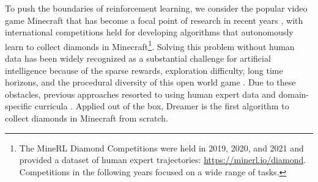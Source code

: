 To push the boundaries of reinforcement learning, we consider the popular video game Minecraft that has become a focal point of research in recent years \citep{guss2019minerl,kanitscheider2021minecraftcurriculum,baker2022vpt}, with international competitions held for developing algorithms that autonomously learn to collect diamonds in Minecraft\footnote{
The MineRL Diamond Competitions were held in 2019, 2020, and 2021 and provided a dataset of human expert trajectories: \url{https://minerl.io/diamond}. Competitions in the following years focused on a wide range of tasks.}.
Solving this problem without human data has been widely recognized as a substantial challenge for artificial intelligence because of the sparse rewards, exploration difficulty, long time horizons, and the procedural diversity of this open world game \citep{guss2019minerl}.
Due to these obstacles, previous approaches resorted to using human expert data and domain-specific curricula \citep{kanitscheider2021minecraftcurriculum,baker2022vpt}.
Applied out of the box, Dreamer is the first algorithm to collect diamonds in Minecraft from scratch.
